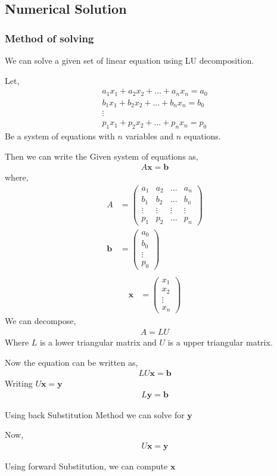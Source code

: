 \documentclass{beamer}
\theoremstyle{remark}
\newcommand{\myvec}[1]{\ensuremath{\begin{pmatrix}#1\end{pmatrix}}}
\let\vec\mathbf
\numberwithin{equation}{section}
\begin{document}
\subsection{Numerical Solution}
\begin{frame}[allowframebreaks]
    \frametitle{Method of solving}
    We can solve a given set of linear equation using LU decomposition.

    Let,
    \begin{align}
        a_1x_1+a_2x_2 + \dots + a_nx_n = a_0\\
        b_1x_1+b_2x_2 + \dots + b_nx_n = b_0\\
        \vdots\\
        p_1x_1+p_2x_2 + \dots + p_nx_n = p_0
    \end{align}
    Be a system of equations with $n$ variables and $n$ equations.

    Then we can write the Given system of equations as,
    \begin{align}
        A\vec{x} = \vec{b}
    \end{align}
    where,
    \begin{align}
        A &= \myvec{a_1 & a_2 & \dots & a_n\\b_1 & b_2 & \dots & b_n\\\vdots & \vdots & \vdots & \vdots\\p_1 & p_2 & \dots & p_n}\\
        \vec{b} &= \myvec{a_0\\b_0\\\vdots\\p_0}\\
    \end{align}
    \begin{align}
        \vec{x} &= \myvec{x_1\\x_2\\\vdots\\x_n}
    \end{align}
    We can decompose,
    \begin{align}
        A = LU
    \end{align}
    Where $L$ is a lower triangular matrix and $U$ is a upper triangular matrix.

    Now the equation can be written as,
    \begin{align}
        LU\vec{x} = \vec{b}
    \end{align}
    Writing $U\vec{x} = \vec{y}$
    \begin{align}
        L\vec{y} = \vec{b}
    \end{align}

    Using back Substitution Method we can solve for $\vec{y}$
    
    Now,
    \begin{align}
        U\vec{x} = \vec{y}
    \end{align}

    Using forward Substitution, we can compute $\vec{x}$
\end{frame}
\end{document}
